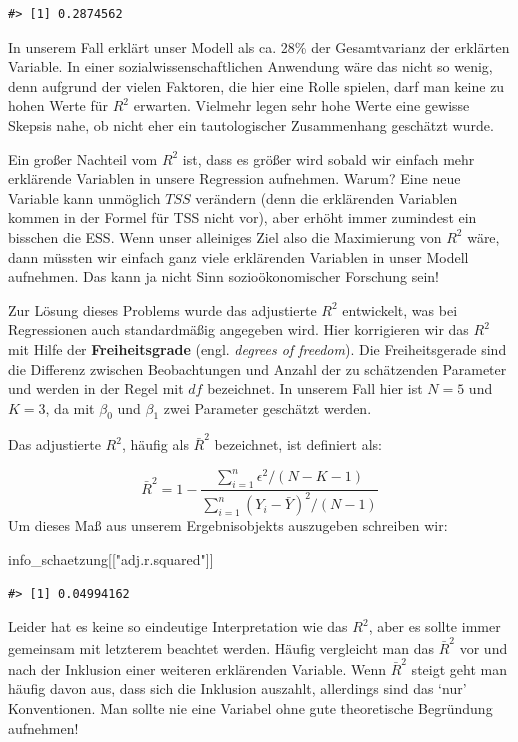 \documentclass[]{book}
\newenvironment{Shaded}{\begin{snugshade}}{\end{snugshade}}
\newcommand{\StringTok}[1]{\textcolor[rgb]{0.31,0.60,0.02}{#1}}
\newcommand{\NormalTok}[1]{#1}
\begin{document}
\begin{verbatim}
#> [1] 0.2874562
\end{verbatim}

In unserem Fall erklärt unser Modell als ca. 28\% der Gesamtvarianz der
erklärten Variable. In einer sozialwissenschaftlichen Anwendung wäre das
nicht so wenig, denn aufgrund der vielen Faktoren, die hier eine Rolle
spielen, darf man keine zu hohen Werte für \(R^2\) erwarten. Vielmehr
legen sehr hohe Werte eine gewisse Skepsis nahe, ob nicht eher ein
tautologischer Zusammenhang geschätzt wurde.

Ein großer Nachteil vom \(R^2\) ist, dass es größer wird sobald wir
einfach mehr erklärende Variablen in unsere Regression aufnehmen. Warum?
Eine neue Variable kann unmöglich \(TSS\) verändern (denn die
erklärenden Variablen kommen in der Formel für TSS nicht vor), aber
erhöht immer zumindest ein bisschen die ESS. Wenn unser alleiniges Ziel
also die Maximierung von \(R^2\) wäre, dann müssten wir einfach ganz
viele erklärenden Variablen in unser Modell aufnehmen. Das kann ja nicht
Sinn sozioökonomischer Forschung sein!

Zur Lösung dieses Problems wurde das adjustierte \(R^2\) entwickelt, was
bei Regressionen auch standardmäßig angegeben wird. Hier korrigieren wir
das \(R^2\) mit Hilfe der \textbf{Freiheitsgrade} (engl. \emph{degrees
of freedom}). Die Freiheitsgerade sind die Differenz zwischen
Beobachtungen und Anzahl der zu schätzenden Parameter und werden in der
Regel mit \(df\) bezeichnet. In unserem Fall hier ist \(N=5\) und
\(K=3\), da mit \(\beta_0\) und \(\beta_1\) zwei Parameter geschätzt
werden.

Das adjustierte \(R^2\), häufig als \(\bar{R}^2\) bezeichnet, ist
definiert als:

\[\bar{R}^2=1-\frac{\sum_{i=1}^n\epsilon^2/(N-K-1)}{\sum_{i=1}^n(Y_i-\bar{Y})^2/(N-1)}\]
Um dieses Maß aus unserem Ergebnisobjekts auszugeben schreiben wir:

\begin{Shaded}
\begin{Highlighting}[]
\NormalTok{info_schaetzung[[}\StringTok{"adj.r.squared"}\NormalTok{]]}
\end{Highlighting}
\end{Shaded}

\begin{verbatim}
#> [1] 0.04994162
\end{verbatim}

Leider hat es keine so eindeutige Interpretation wie das \(R^2\), aber
es sollte immer gemeinsam mit letzterem beachtet werden. Häufig
vergleicht man das \(\bar{R}^2\) vor und nach der Inklusion einer
weiteren erklärenden Variable. Wenn \(\bar{R}^2\) steigt geht man häufig
davon aus, dass sich die Inklusion auszahlt, allerdings sind das `nur'
Konventionen. Man sollte nie eine Variabel ohne gute theoretische
Begründung aufnehmen!
\end{document}
